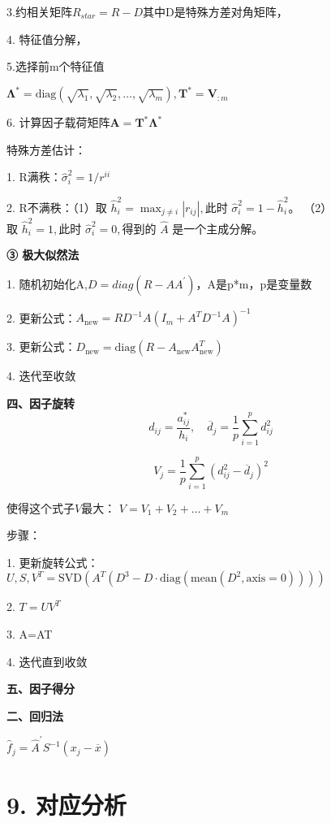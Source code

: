 \documentclass[10pt,a4paper]{ctexart} %
\begin{document}
\begin{multicols*}{3}
		3.约相关矩阵$R_{star}=R-D$其中D是特殊方差对角矩阵，
		
		4. 特征值分解，
		
		5.选择前m个特征值
		
		$\mathbf{\Lambda}^{*}=\mathrm{diag}(\sqrt{\lambda_{1}},\sqrt{\lambda_{2}},\ldots,\sqrt{\lambda_{m}}),\mathbf{T}^{*}=\mathbf{V}_{:m}$ 
		
		6. 计算因子载荷矩阵$\mathbf{A}=\mathbf{T}^*\mathbf{\Lambda}^*$
		
		特殊方差估计：
		
		1. R满秩：$\hat{\sigma}_{i}^{2}=1/r^{ii}$
		
		2. R不满秩：（1）$\text{取 }\hat{h}_i^2=\max_{j\neq i}|r_{ij}|,\text{此时 }\hat{\sigma}_i^2=1-\hat{h}_i^2$。
		（2）$\text{取 }\hat{h}_i^2=1,\text{此时 }\hat{\sigma}_i^2=0,\text{得到的 }\hat{A}\text{ 是一个主成分解。}$
		
		\textbf{③ 极大似然法}
		
		1. 随机初始化A,$D = diag(R-AA^{\prime})$，A是p*m，p是变量数
		
		2. 更新公式：$A_{\mathrm{new}}=RD^{-1}A(I_m+A^TD^{-1}A)^{-1}$
		
		3. 更新公式：$D_{\mathrm{new}}=\mathrm{diag}(R-A_{\mathrm{new}}A_{\mathrm{new}}^T)$
		
		4. 迭代至收敛
		
		\textbf{四、因子旋转}
		$$d_{ij}=\frac{a_{ij}^*}{h_i},\quad\overline{d}_j=\frac{1}{p}\sum_{i=1}^pd_{ij}^2$$
		
		$$V_j=\frac{1}{p}\sum_{i=1}^{p}(d_{ij}^{2}-\overline{d}_{j})^{2}$$
		
		使得这个式子$V$最大：
		$V=V_1+V_2+\dots +V_m$
		
		步骤：
		
		1. 更新旋转公式：$U,S,V^T=\mathrm{SVD}(A^T(D^3-D\cdot\mathrm{diag}(\mathrm{mean}(D^2,\mathrm{axis}=0))))$
		
		2. $T=UV^T$
		
		3. A=AT
		
		4. 迭代直到收敛
		
		\textbf{五、因子得分}
		
		\textbf{二、回归法}
		
		$\hat{f}_{j}=\hat{A}^{\prime}S^{-1}\left(x_{j}-\overline{x}\right)$
		
		\section*{\centering \normalsize 9. 对应分析}
		

\end{multicols*}
\end{document}

